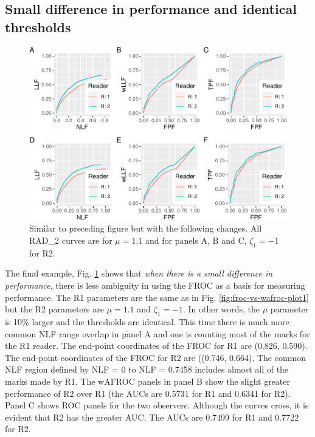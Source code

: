 \documentclass[
]{book}
\begin{document}
\hypertarget{small-difference-in-performance-and-identical-thresholds}{%
\subsection{Small difference in performance and identical thresholds}\label{small-difference-in-performance-and-identical-thresholds}}

\begin{figure}
\centering
\includegraphics{13c-froc-vs-wafroc_files/figure-latex/froc-vs-wafroc-plot3-1.pdf}
\caption{\label{fig:froc-vs-wafroc-plot3}Similar to preceding figure but with the following changes. All RAD\_2 curves are for \(\mu = 1.1\) and for panels A, B and C, \(\zeta_1 = -1\) for R2.}
\end{figure}

The final example, Fig. \ref{fig:froc-vs-wafroc-plot3} shows that \emph{when there is a small difference in performance}, there is less ambiguity in using the FROC as a basis for measuring performance. The R1 parameters are the same as in Fig. \ref{fig:froc-vs-wafroc-plot1} but the R2 parameters are \(\mu = 1.1\) and \(\zeta_1= -1\). In other words, the \(\mu\) parameter is 10\% larger and the thresholds are identical. This time there is much more common NLF range overlap in panel A and one is counting most of the marks for the R1 reader. The end-point coordinates of the FROC for R1 are (0.826, 0.590). The end-point coordinates of the FROC for R2 are ((0.746, 0.664). The common NLF region defined by NLF = 0 to NLF = 0.7458 includes almost all of the marks made by R1. The wAFROC panels in panel B show the slight greater performance of R2 over R1 (the AUCs are 0.5731 for R1 and 0.6341 for R2). Panel C shows ROC panels for the two observers. Although the curves cross, it is evident that R2 has the greater AUC. The AUCs are 0.7499 for R1 and 0.7722 for R2.
\end{document}
